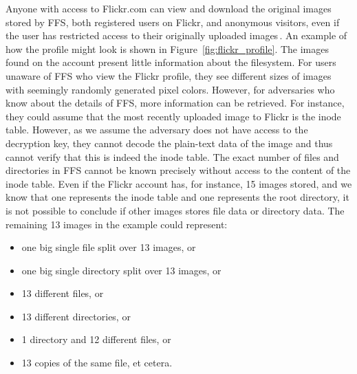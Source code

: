 Anyone with access to Flickr.com can view and download the original images stored by \gls{FFS}, both registered users on Flickr, and anonymous visitors, even if the user has restricted access to their originally uploaded images\,\cite{FlickrHelpForum2020}. An example of how the profile might look is shown in Figure~\ref{fig:flickr_profile}. The images found on the account present little information about the filesystem. For users unaware of \gls{FFS} who view the Flickr profile, they see different sizes of images with seemingly randomly generated pixel colors. However, for adversaries who know about the details of \gls{FFS}, more information can be retrieved. For instance, they could assume that the most recently uploaded image to Flickr is the inode table. However, as we assume the adversary does not have access to the decryption key, they cannot decode the \mbox{plain-text} data of the image and thus cannot verify that this is indeed the inode table. The exact number of files and directories in \gls{FFS} cannot be known precisely without access to the content of the inode table. Even if the Flickr account has, for instance, 15 images stored, and we know that one represents the inode table and one represents the root directory, it is not possible to conclude if other images stores file data or directory data. The remaining 13 images in the example could represent:
\begin{itemize}
	\item one big single file split over 13 images, or
	\item one big single directory split over 13 images, or
	\item 13 different files, or
	\item 13 different directories, or
	\item 1 directory and 12 different files, or
	\item 13 copies of the same file, et cetera.
\end{itemize}
